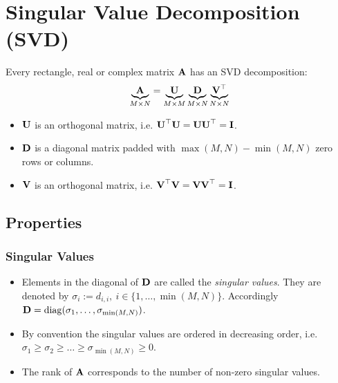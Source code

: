 \chapter{Singular Value Decomposition (SVD)}

\begin{definition}
Every rectangle, real or complex matrix \(\boldsymbol{\mathrm{A}}\) has an SVD decomposition:
\[
\underbrace{\boldsymbol{\mathrm{A}}}_{M \times N} = \underbrace{\boldsymbol{\mathrm{U}}}_{M \times M} \underbrace{\boldsymbol{\mathrm{D}}}_{M \times N} \underbrace{\boldsymbol{\mathrm{V}}^\top}_{N \times N}
\]

\begin{itemize}
\item \(\boldsymbol{\mathrm{U}}\) is an orthogonal matrix, i.e. \(\boldsymbol{\mathrm{U}}^\top \boldsymbol{\mathrm{U}} = \boldsymbol{\mathrm{U}} \boldsymbol{\mathrm{U}}^\top = \boldsymbol{\mathrm{I}}\).

\item \(\boldsymbol{\mathrm{D}}\) is a diagonal matrix padded with \(\max(M, N) - \min(M, N)\) zero rows or columns.

\item \(\boldsymbol{\mathrm{V}}\) is an orthogonal matrix, i.e. \(\boldsymbol{\mathrm{V}}^\top \boldsymbol{\mathrm{V}} = \boldsymbol{\mathrm{V}} \boldsymbol{\mathrm{V}}^\top = \boldsymbol{\mathrm{I}}\).

\end{itemize}
\end{definition}

\section{Properties}

\subsection{Singular Values}
\begin{itemize}
\item Elements in the diagonal of \(\boldsymbol{\mathrm{D}}\) are called the \textit{singular values}. They are denoted by \(\sigma_i := d_{i,i},\ i \in \{1, \ldots, \min(M,N)\}\). Accordingly \(\boldsymbol{\mathrm{D}} = \operatorname{diag}(\sigma_1, \ldots, \sigma_{\min(M,N)})\).

\item By convention the singular values are ordered in decreasing order, i.e. \(\sigma_1 \geq \sigma_2 \geq \ldots \geq \sigma_{\min(M,N)} \geq 0\).

\item The rank of \(\boldsymbol{\mathrm{A}}\) corresponds to the number of non-zero singular values.
\end{itemize}

